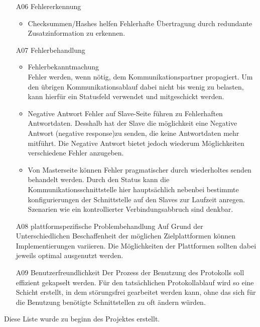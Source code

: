 \begin{itemize}
	\item [A06] Fehlererkennung\\
		\begin{itemize}
			\item Checksummen/Hashes helfen Fehlerhafte Übertragung durch redundante Zusatzinformation zu erkennen.	
		\end{itemize}

	\item [A07] Fehlerbehandlung\\
		\begin{itemize}
			\item Fehlerbekanntmachung\\
				Fehler werden, wenn nötig, dem Kommunikationspartner propagiert. Um den übrigen Kommunikationsablauf dabei nicht bis wenig zu belasten, kann hierfür ein Statusfeld verwendet und mitgeschickt werden.
			\item Negative Antwort
				Fehler auf Slave-Seite führen zu Fehlerhaften Antwortdaten. Desshalb hat der Slave die möglichkeit eine Negative Antwort (negative response)zu senden, die keine Antwortdaten mehr mitführt. Die Negative Antwort bietet jedoch wiederum Möglichkeiten verschiedene Fehler anzugeben.\par
			\item Von Masterseite können Fehler pragmatischer durch wiederholtes senden behandelt werden. Durch den Status kann die Kommunikationsschnittstelle hier hauptsächlich nebenbei bestimmte konfigurierungen der Schnittstelle auf den Slaves zur Laufzeit anregen. Szenarien wie ein kontrollierter Verbindungsabbruch sind denkbar.\par
		\end{itemize}
	
	\item [A08] plattformspezifische Problembehandlung
		Auf Grund der Unterschiedlichen Beschaffenheit der möglichen Zielplattformen können Implementierungen variieren. Die Möglichkeiten der Plattformen sollten dabei jeweils optimal ausgenutzt werden.

	\item [A09] Benutzerfreundlichkeit
		Der Prozess der Benutzung des Protokolls soll effizient gekapselt werden. Für den tatsächlichen Protokollablauf wird so eine Schicht erstellt, in dem störungsfrei gearbeitet werden kann, ohne das sich für die Benutzung benötigte Schnittstellen zu oft ändern würden.
\end{itemize}

Diese Liste wurde zu beginn des Projektes erstellt.

